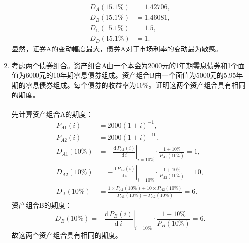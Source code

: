 \begin{enumerate}
    \begin{align*}
        D_A(15.1\%) & = 1.42706,\\D_B(15.1\%) & = 1.46081,\\D_C(15.1\%) & = 1.5, \\ D_D(15.1\%) & = 1.
    \end{align*}
    显然，证券A的变动幅度最大，债券A对于市场利率的变动最为敏感。
    \item 考虑两个债券组合。资产组合A由一个本金为2000元的1年期零息债券和1个面值为6000元的10年期零息债券组成。资产组合B由一个面值为5000元的5.95年期的零息债券组成。每个债券的收益率为10\%。证明这两个资产组合具有相同的期度。\\
    \pro\\
    先计算资产组合A的期度：
    \begin{align*}
        P_{A1}(i) & = 2000(1 + i)^{-1},\\
        P_{A2}(i) & = 2000(1 + i)^{-10},\\
        D_{A1}(10\%) & = \left.-\frac{\mathrm{d}\, P_{A1}(i)}{\mathrm{d} \, i}\right| _{i = 10\%} \cdot \frac{1 + 10\%}{P_{A1}(10\%)} = 1,\\
        D_{A2}(10\%) & = \left.-\frac{\mathrm{d}\, P_{A2}(i)}{\mathrm{d} \, i}\right| _{i = 10\%} \cdot \frac{1 + 10\%}{P_{A2}(10\%)} = 10,\\
        D_A(10\%) & = \frac{1 \times P_{A1}(10\%) + 10 \times P_{A2}(10\%)}{P_{A1}(10\%) + P_{A2}(10\%)} = 6.
    \end{align*}
    资产组合B的期度：
    \[D_B(10\%) =  \left.-\frac{\mathrm{d}\, P_{B}(i)}{\mathrm{d} \, i}\right| _{i = 10\%} \cdot \frac{1 + 10\%}{P_B(10\%)} = 6.\]
    故这两个资产组合具有相同的期度。
\end{enumerate}
\clearpage